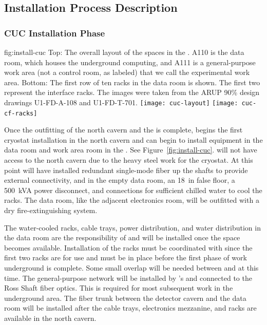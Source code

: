 \subsection{Installation Process Description}
\label{sec:fdsp-tc-inst-proc}


\subsubsection{CUC Installation Phase}
\label{sec:fdsp-tc-inst-CUC}

\begin{dunefigure}{fig:install-cuc}
  {Top: The overall layout of the  spaces in the . A110 is the  data room, which houses the underground computing, and A111 is a general-purpose work area (not a control room, as labeled) that we call the experimental work area. Bottom: The first row of ten racks in the data room is shown. The first two represent the  interface racks. The images were taken from the ARUP 90\% design drawings U1-FD-A-108 and U1-FD-T-701.
  }
\texttt{[image: cuc-layout]}
\vspace{-2pt}
\texttt{[image: cuc-cf-racks]}
\end{dunefigure}

 
Once the   outfitting of the north cavern and the  is complete,   begins the first cryostat installation in the north cavern and  can begin to install equipment in the data room and work area room in the . See Figure~\ref{fig:install-cuc}.   will not have access to the north cavern due to the heavy steel work for the cryostat. 
At this point    will have installed redundant single-mode fiber up the shafts to provide external connectivity, and in the empty data room,  an \SI{18}{in} false floor, a \SI{500}{kVA} power disconnect, and connections for sufficient chilled water to cool the racks. The data room, like the adjacent  electronics room, will be outfitted with a dry fire-extinguishing system. 
 

The water-cooled racks, cable trays, power distribution, and water distribution in the data room are the responsibility of  and will be installed once the space becomes available.  
Installation of the racks must be coordinated with  
since the first two racks are for  use and must be in place before the first phase of work underground is complete. 
Some small overlap will be needed between  and  at this time. The general-purpose network will be installed by 's  and connected to the Ross Shaft fiber optics. 
This is required for most subsequent work in the underground area.
The  fiber trunk between the detector cavern and the  data room will be installed after the cable trays, electronics mezzanine, and racks are available in the north cavern.


